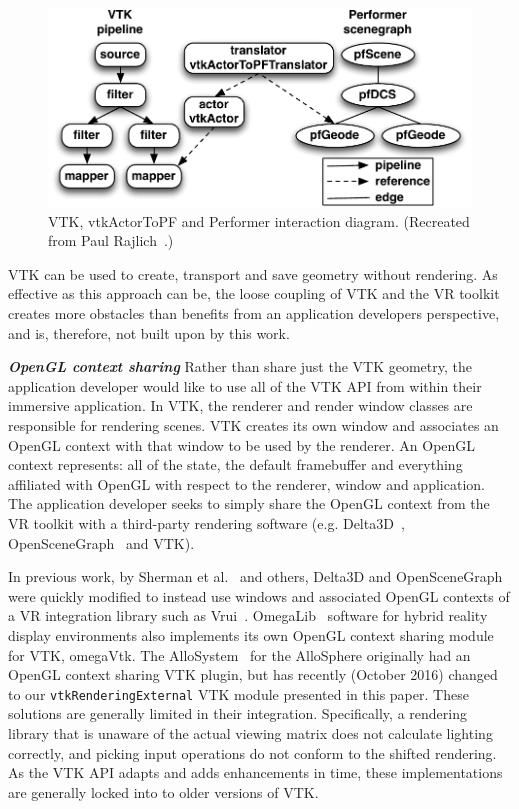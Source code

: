 \begin{figure}[h!]
  \centering
  \includegraphics[width=\linewidth]{images/vtkActorToPF.pdf}
  \caption{VTK, vtkActorToPF and Performer interaction diagram. (Recreated from Paul Rajlich~\cite{Leigh98limbo/vtk}.)}
  \label{fig:vtkActorToPF}
\end{figure}

VTK can be used to create, transport and save geometry without rendering. As effective as this approach can be, the loose coupling of VTK and the VR toolkit creates more obstacles than benefits from an application developers perspective, and is, therefore, not built upon by this work.

\textbf{\textit{OpenGL context sharing}} Rather than share just the VTK geometry, the application developer would like to use all of the VTK API from within their immersive application.
In VTK, the renderer and render window classes are responsible for rendering scenes.
VTK creates its own window and associates an OpenGL context with that window to be used by the renderer.
An OpenGL context represents: all of the state, the default framebuffer and everything affiliated with OpenGL with respect to the renderer, window and application.
The application developer seeks to simply share the OpenGL context from the VR toolkit with a third-party rendering software (e.g. Delta3D~\cite{McDowell:2006}, OpenSceneGraph~\cite{Wang:2010} and VTK). 

In previous work, by Sherman et al.~\cite{Sherman:2010} and others, Delta3D
and OpenSceneGraph were quickly modified to instead use windows and associated
OpenGL contexts of a VR integration library such as Vrui~\cite{Kreylos:2006}.  
OmegaLib~\cite{Febretti:2014} software for hybrid reality display environments also implements its own OpenGL context sharing module for VTK, omegaVtk. The AlloSystem~\cite{Amatriain:2009} for the AlloSphere originally had an OpenGL context sharing VTK plugin, but has recently (October 2016) changed to our \texttt{vtkRenderingExternal} VTK module presented in this paper.
These solutions are generally limited in their integration.
Specifically, a rendering library that is unaware of the actual
viewing matrix does not calculate lighting correctly, and
picking input operations do not conform to the shifted rendering. As the VTK API adapts and adds enhancements in time, these implementations are generally locked into to older versions of VTK.

